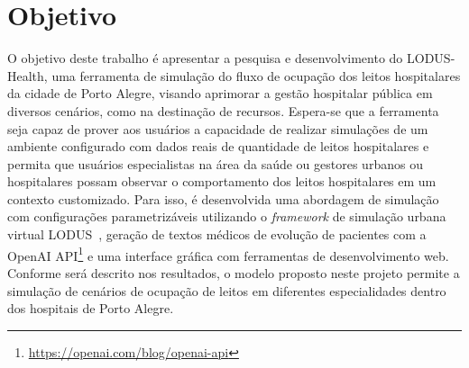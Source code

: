 \section{Objetivo}
O objetivo deste trabalho é apresentar a pesquisa e desenvolvimento do LODUS-Health, uma ferramenta de simulação do fluxo de ocupação dos leitos hospitalares da cidade de Porto Alegre, 
visando aprimorar a gestão hospitalar pública em diversos cenários, como na destinação de recursos. Espera-se que a ferramenta seja capaz de prover aos usuários a capacidade de realizar simulações de um ambiente configurado com dados reais de quantidade de leitos hospitalares e permita que usuários especialistas na área da saúde ou gestores urbanos ou hospitalares possam observar o comportamento dos leitos hospitalares em um contexto customizado. Para isso, é desenvolvida uma abordagem de simulação com configurações parametrizáveis utilizando o \textit{framework} de simulação urbana virtual LODUS~\cite{9239083}, geração de textos médicos de evolução de pacientes com a OpenAI API\footnote{\url{https://openai.com/blog/openai-api}} e uma interface gráfica com ferramentas de desenvolvimento web. Conforme será descrito nos resultados, o modelo proposto neste projeto permite a simulação de cenários de ocupação de leitos em diferentes especialidades dentro dos hospitais de Porto Alegre. %




